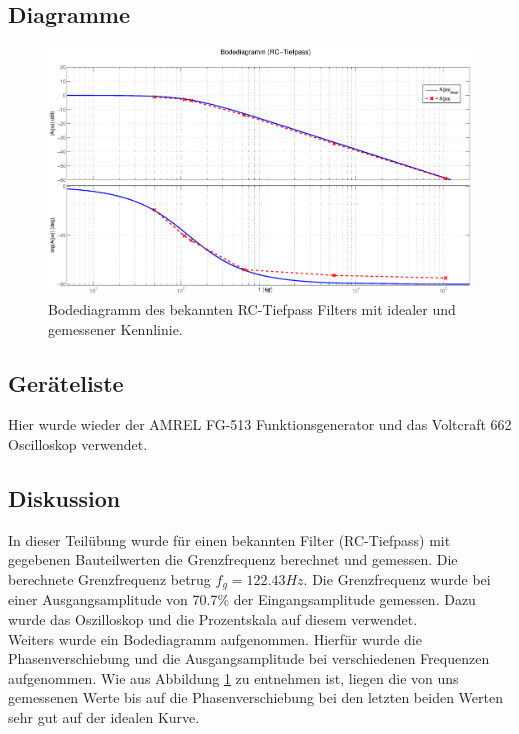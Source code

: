 \documentclass[12pt,a4paper,ngerman]{article}
\begin{document}
\subsection{Diagramme}
\begin{figure}[H]
\centering
\includegraphics[width=1.1\textwidth]{figures/bode_rc.eps} 
\caption{Bodediagramm des bekannten RC-Tiefpass Filters mit idealer und gemessener Kennlinie.}
\label{fig:bode_bek}
\end{figure}


\subsection{Geräteliste}
Hier wurde wieder der AMREL FG-513 Funktionsgenerator und das Voltcraft 662 Oscilloskop verwendet.

\subsection{Diskussion}
In dieser Teilübung wurde für einen bekannten Filter (RC-Tiefpass) mit gegebenen Bauteilwerten
die Grenzfrequenz berechnet und gemessen. Die berechnete Grenzfrequenz betrug $f_g = 122.43Hz$. Die Grenzfrequenz wurde bei einer Ausgangsamplitude von 70.7\% der Eingangsamplitude gemessen. Dazu wurde das Oszilloskop und die Prozentskala auf diesem verwendet.\\
Weiters wurde ein Bodediagramm aufgenommen. Hierfür wurde die Phasenverschiebung und die Ausgangsamplitude bei verschiedenen Frequenzen aufgenommen. Wie aus Abbildung \ref{fig:bode_bek} zu entnehmen ist, liegen die von uns gemessenen Werte bis auf die Phasenverschiebung bei den letzten beiden Werten sehr gut auf der idealen Kurve.



 



   
\end{document}
